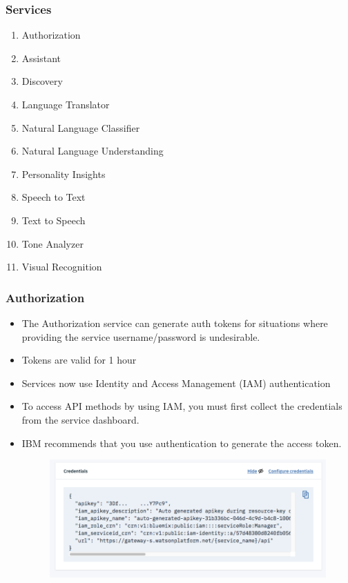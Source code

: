 \documentclass[11pt]{beamer}
\begin{document}
\begin{frame}
	\frametitle{Services}
	\begin{enumerate}
		\item Authorization
		\item Assistant
		\item Discovery
		\item Language Translator
		\item Natural Language Classifier
		\item Natural Language Understanding
		\item Personality Insights
		\item Speech to Text
		\item Text to Speech
		\item Tone Analyzer
		\item Visual Recognition
	\end{enumerate}
\end{frame}

\begin{frame}
	\frametitle{Authorization}
	\begin{itemize}
		\item The Authorization service can generate auth tokens for situations where providing the service username/password is undesirable.
		\item Tokens are valid for 1 hour
		\item Services now use Identity and Access Management (IAM) authentication
		\item To access API methods by using IAM, you must first collect the credentials from the service dashboard.
		\item IBM recommends that you use authentication to generate the access token. 
		\begin{figure}[h]
			\centering
			\includegraphics[scale=.2]{images/IAM-apikey}
			\label{IAM-apikey}
		\end{figure}
	
		
	\end{itemize}
\end{frame}
\end{document}
